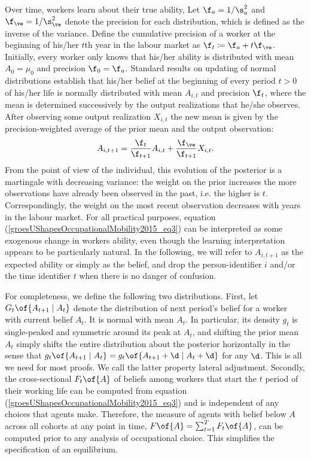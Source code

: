 \documentclass[12pt]{article}
\theoremstyle{definition}
\begin{document}
Over time, workers learn about their true ability, Let $\f_a = 1 / \s_a^2$ and $\f_{\ve} = 1 / \s_{\ve}^2$ denote the precision for each distribution, which is defined as the inverse of the variance. Define the cumulative precision of a worker at the beginning of his/her $t$th year in the labour market as $\f_t \coloneqq \f_a + t \f_{\ve}$. Initially, every worker only knows that his/her ability is distributed with mean $A_0 = \mu_0$ and precision $\f_0 = \f_a$. Standard results on updating of normal distributions establish that his/her belief at the beginning of every period $t > 0$ of his/her life is normally distributed with mean $A_{i,t}$ and precision $\f_t$, where the mean is determined successively by the output realizations that he/she observes. After observing some output realization $X_{i,t}$ the new mean is given by the precision-weighted average of the prior mean and the output observation:
\begin{equation}
    \label{groesUShapesOccupationalMobility2015_eq3}
    A_{i, t+1} = \frac{\f_t}{\f_{t+1}} A_{i,t} + \frac{\f_{\ve}}{\f_{t+1}} X_{i,t}.
\end{equation}
From the point of view of the individual, this evolution of the posterior is a martingale with decreasing variance: the weight on the prior increases the more observations have already been observed in the past, i.e. the higher is $t$. Correspondingly, the weight on the most recent observation decreases with years in the labour market. For all practical purposes, equation (\ref{groesUShapesOccupationalMobility2015_eq3}) can be interpreted as some exogenous change in workers ability, even though the learning interpretation appears to be particularly natural. In the following, we will refer to $A_{i, t+1}$ as the expected ability or simply as the belief, and drop the person-identifier $i$ and/or the time identifier $t$ when there is no danger of confusion.

For completeness, we define the following two distributions. First, let $G_{t}\of{A_{t+1} \mid A_t}$ denote the distribution of next period's belief for a worker with current belief $A_t$. It is normal with mean $A_t$. In particular, its density $g_t$ is single-peaked and symmetric around its peak at $A_t$, and shifting the prior mean $A_t$ simply shifts the entire distribution about the posterior horizontally in the sense that $g_{t}\of{A_{t+1} \mid A_t} = g_{t}\of{A_{t+1}+\d \mid A_t+\d}$ for any $\d$. This is all we need for most proofs. We call the latter property lateral adjustment. Secondly, the cross-sectional $F_t\of{A}$ of beliefs among workers that start the $t$ period of their working life can be computed from equation (\ref{groesUShapesOccupationalMobility2015_eq3}) and is independent of any choices that agents make. Therefore, the measure of agents with belief below $A$ across all cohorts at any point in time, $F\of{A} = \sum_{t=1}^{T} F_{t}\of{A}$, can be computed prior to any analysis of occupational choice. This simplifies the specification of an equilibrium.
\end{document}
